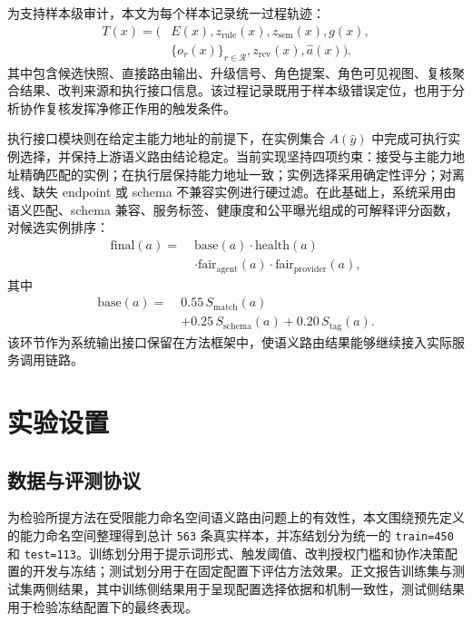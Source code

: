 \documentclass[10pt,a4paper,twocolumn,fontset=fandol]{ctexart}
\begin{document}
为支持样本级审计，本文为每个样本记录统一过程轨迹：
\begin{equation}
\begin{aligned}
T(x)=\bigl(&E(x), z_{\mathrm{rule}}(x), z_{\mathrm{sem}}(x), g(x),\\
&\{o_r(x)\}_{r\in\mathcal{R}}, z_{\mathrm{rev}}(x), \hat a(x)\bigr).
\end{aligned}
\end{equation}
其中包含候选快照、直接路由输出、升级信号、角色提案、角色可见视图、复核聚合结果、改判来源和执行接口信息。该过程记录既用于样本级错误定位，也用于分析协作复核发挥净修正作用的触发条件。

执行接口模块则在给定主能力地址的前提下，在实例集合 $A(\hat y)$ 中完成可执行实例选择，并保持上游语义路由结论稳定。当前实现坚持四项约束：接受与主能力地址精确匹配的实例；在执行层保持能力地址一致；实例选择采用确定性评分；对离线、缺失 endpoint 或 schema 不兼容实例进行硬过滤。在此基础上，系统采用由语义匹配、schema 兼容、服务标签、健康度和公平曝光组成的可解释评分函数，对候选实例排序：
\begin{equation}
\begin{aligned}
\text{final}(a)=\;&\text{base}(a)\cdot \text{health}(a)\\
&\cdot \text{fair}_{\text{agent}}(a)\cdot \text{fair}_{\text{provider}}(a),
\end{aligned}
\end{equation}
其中
\begin{equation}
\begin{aligned}
\text{base}(a)=\;&0.55\,S_{\text{match}}(a)\\
&+0.25\,S_{\text{schema}}(a)+0.20\,S_{\text{tag}}(a).
\end{aligned}
\end{equation}
该环节作为系统输出接口保留在方法框架中，使语义路由结果能够继续接入实际服务调用链路。

\section{实验设置}

\subsection{数据与评测协议}

为检验所提方法在受限能力命名空间语义路由问题上的有效性，本文围绕预先定义的能力命名空间整理得到总计 \texttt{563} 条真实样本，并冻结划分为统一的 \texttt{train=450} 和 \texttt{test=113}。训练划分用于提示词形式、触发阈值、改判授权门槛和协作决策配置的开发与冻结；测试划分用于在固定配置下评估方法效果。正文报告训练集与测试集两侧结果，其中训练侧结果用于呈现配置选择依据和机制一致性，测试侧结果用于检验冻结配置下的最终表现。
\end{document}
